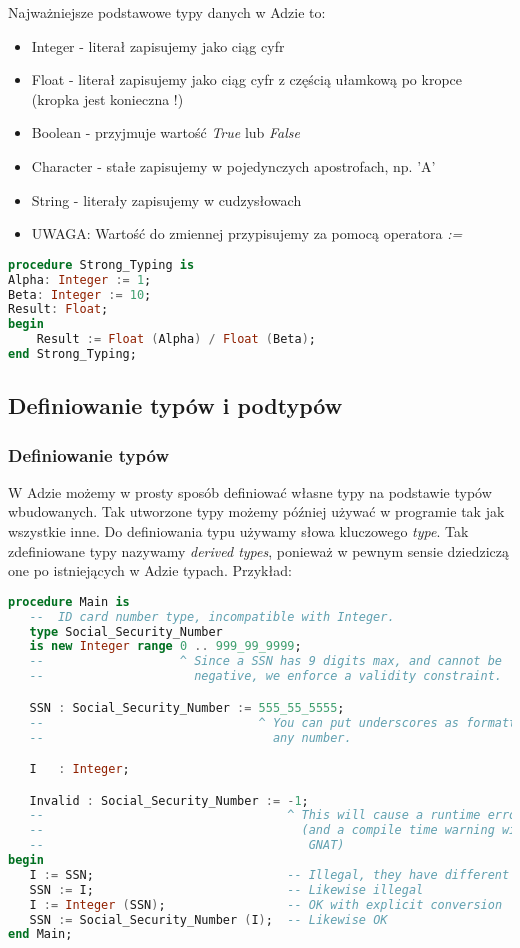 \documentclass[a4paper,15pt]{article}
\begin{document}
Najważniejsze podstawowe typy danych w Adzie to:

\begin{itemize}
\item Integer - literał zapisujemy jako ciąg cyfr
\item Float - literał zapisujemy jako ciąg cyfr z częścią ułamkową po kropce (kropka jest konieczna !)
\item Boolean - przyjmuje wartość \textit{True} lub \textit{False}
\item Character - stałe zapisujemy w pojedynczych apostrofach, np. 'A'
\item String - literały zapisujemy w cudzysłowach
\item UWAGA: Wartość do zmiennej przypisujemy za pomocą operatora \textit{:=}
\end{itemize}

\begin{lstlisting}[language=Ada, caption=Silne typowanie]
procedure Strong_Typing is
Alpha: Integer := 1; 
Beta: Integer := 10;
Result: Float;
begin
	Result := Float (Alpha) / Float (Beta);
end Strong_Typing;
\end{lstlisting}

\subsection{Definiowanie typów i podtypów}

\subsubsection{Definiowanie typów}
W Adzie możemy w prosty sposób definiować własne typy na podstawie typów wbudowanych. Tak utworzone typy możemy później używać w programie tak jak wszystkie inne. Do definiowania typu używamy słowa kluczowego \textit{type}. Tak zdefiniowane typy nazywamy \textit{derived types}, ponieważ w pewnym sensie dziedziczą one po istniejących w Adzie typach. Przykład:

\begin{lstlisting}[language=Ada]
procedure Main is
   --  ID card number type, incompatible with Integer.
   type Social_Security_Number
   is new Integer range 0 .. 999_99_9999;
   --                   ^ Since a SSN has 9 digits max, and cannot be
   --                     negative, we enforce a validity constraint.

   SSN : Social_Security_Number := 555_55_5555;
   --                              ^ You can put underscores as formatting in
   --                                any number.

   I   : Integer;

   Invalid : Social_Security_Number := -1;
   --                                  ^ This will cause a runtime error
   --                                    (and a compile time warning with
   --                                     GNAT)
begin
   I := SSN;                           -- Illegal, they have different types
   SSN := I;                           -- Likewise illegal
   I := Integer (SSN);                 -- OK with explicit conversion
   SSN := Social_Security_Number (I);  -- Likewise OK
end Main;
\end{lstlisting}
\end{document}
